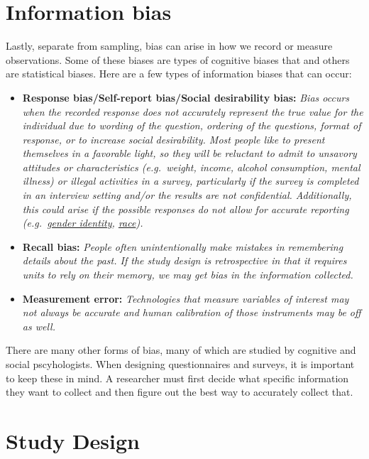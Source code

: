 \documentclass[
]{book}
\begin{document}
\section{Information bias}\label{information-bias}

Lastly, separate from sampling, bias can arise in how we record or measure observations. Some of these biases are types of cognitive biases that and others are statistical biases. Here are a few types of information biases that can occur:

\begin{itemize}
\item
  \textbf{Response bias/Self-report bias/Social desirability bias:} \emph{Bias occurs when the recorded response does not accurately represent the true value for the individual due to wording of the question, ordering of the questions, format of response, or to increase social desirability. Most people like to present themselves in a favorable light, so they will be reluctant to admit to unsavory attitudes or characteristics (e.g.~weight, income, alcohol consumption, mental illness) or illegal activities in a survey, particularly if the survey is completed in an interview setting and/or the results are not confidential. Additionally, this could arise if the possible responses do not allow for accurate reporting (e.g.~\href{https://www.hrc.org/resources/collecting-transgender-inclusive-gender-data-in-workplace-and-other-surveys}{gender identity}, \href{https://www.pewsocialtrends.org/interactives/multiracial-timeline/}{race}).}
\item
  \textbf{Recall bias:} \emph{People often unintentionally make mistakes in remembering details about the past. If the study design is retrospective in that it requires units to rely on their memory, we may get bias in the information collected.}
\item
  \textbf{Measurement error:} \emph{Technologies that measure variables of interest may not always be accurate and human calibration of those instruments may be off as well.}
\end{itemize}

There are many other forms of bias, many of which are studied by cognitive and social pscyhologists. When designing questionnaires and surveys, it is important to keep these in mind. A researcher must first decide what specific information they want to collect and then figure out the best way to accurately collect that.

\section{Study Design}\label{study-design}
\end{document}
